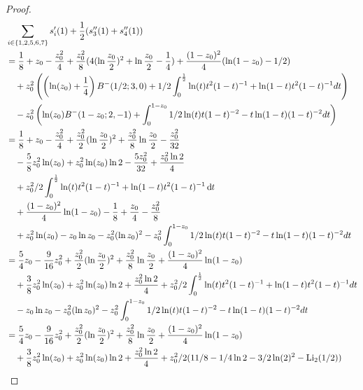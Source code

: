 \begin{proof}
\begin{align*}
&\sum_{i \in\{1,2,5,6,7\}} s_i'(1)+\frac{1}{2}(s_3''(1)+s_4''(1))\\
	&=\frac{1}{8}+z_0-\frac{z_0^2}{4}+\frac{z_0^2}{8}(4(\ln\frac{z_0}{2})^2+\ln\frac{z_0}{2} - \frac{1}{4}) 
		+\frac{(1-z_0)^2}{4} (\ln(1-z_0)-1/2 )\\
	&\hspace{10pt}+z_0^2\left(\left(\ln(z_0)+\frac{1}{4}\right) B^-(1/2;3,0)+1/2\int_0^{\frac{1}{2}} 
		\ln(t)t^2(1-t)^{-1}+\ln(1-t)t^2(1-t)^{-1}dt \right) \\
	&\hspace{10pt}- z_0^{2}\left(\ln(z_0)B^-(1-z_0;2,-1)+\int_0^{1-z_0} 1/2\ln(t)t(1-t)^{-2}-t\ln(1-t)(1-t)^{-2}dt \right) \\
	&=\frac{1}{8}+z_0-\frac{z_0^2}{4}+\frac{z_0^2}{2}(\ln\frac{z_0}{2})^2
		+\frac{z_0^2}{8}\ln\frac{z_0}{2} - \frac{z_0^2}{32} \\
	&\hspace{10pt}-\frac{5}{8}z_0^2\ln(z_0)+z_0^2\ln(z_0)\ln 2-\frac{5z_0^2}{32} +\frac{z_0^2 \ln2}{4}\\
	&\hspace{10pt}+z_0^2/2\int_0^{\frac{1}{2}} \ln(t)t^2(1-t)^{-1}+\ln(1-t)t^2(1-t)^{-1}\dd t \\
	&\hspace{10pt}+\frac{(1-z_0)^2}{4}\ln(1-z_0) -\frac{1}{8}+\frac{z_0}{4}-\frac{z_0^2}{8}\\
	&\hspace{10pt}+ z_0^2\ln(z_0)-z_0 \ln z_0-z_0^2(\ln z_0)^2
		-z_0^2\int_0^{1-z_0} 1/2\ln(t)t(1-t)^{-2}-t\ln(1-t)(1-t)^{-2}dt \\
	&=\frac{5}{4}z_0-\frac{9}{16}z_0^2 +\frac{z_0^2}{2}(\ln\frac{z_0}{2})^2+\frac{z_0^2}{8}\ln\frac{z_0}{2} 
		+\frac{(1-z_0)^2}{4}\ln(1-z_0) \\
	&\hspace{10pt}+\frac{3}{8}z_0^2\ln(z_0)+z_0^2\ln(z_0)\ln 2+\frac{z_0^2 \ln2}{4}
		+z_0^2/2\int_0^{\frac{1}{2}} \ln(t)t^2(1-t)^{-1}+\ln(1-t)t^2(1-t)^{-1}dt \\
	&\hspace{10pt}-z_0 \ln z_0-z_0^2(\ln z_0)^2-z_0^2\int_0^{1-z_0} 1/2\ln(t)t(1-t)^{-2}-t\ln(1-t)(1-t)^{-2}dt \\
	&=\frac{5}{4}z_0-\frac{9}{16}z_0^2 +\frac{z_0^2}{2}(\ln\frac{z_0}{2})^2+\frac{z_0^2}{8}\ln\frac{z_0}{2} 
		+\frac{(1-z_0)^2}{4}\ln(1-z_0) \\
	&\hspace{10pt}+\frac{3}{8}z_0^2\ln(z_0)+z_0^2\ln(z_0)\ln 2+\frac{z_0^2 \ln2}{4}
		+z_0^2/2(11/8 -1/4 \ln 2 -3/2\ln(2)^2 -  \Li_2(1/2)) \\

\end{align*}
\end{proof}
